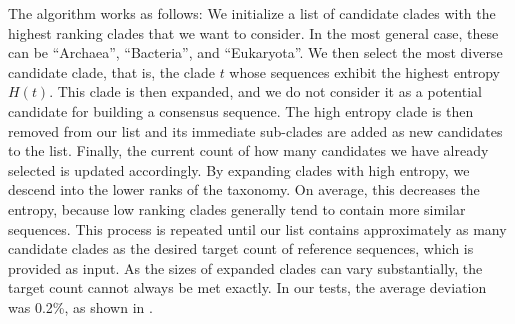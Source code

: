 The algorithm works as follows:
We initialize a list of candidate clades with the highest ranking clades that we want to consider.
In the most general case, these can be ``Archaea'',  ``Bacteria'', and ``Eukaryota''.
We then select the most diverse candidate clade, that is,
the clade $t$ whose sequences exhibit the highest entropy $H(t)$.
This clade is then expanded,
and we do not consider it as a potential candidate for building a consensus sequence.
The high entropy clade is then removed from our list and its immediate sub-clades are added as new candidates to the list.
Finally, the current count of how many candidates we have already selected is updated accordingly.
By expanding clades with high entropy, we descend into the lower ranks of the taxonomy.
On average, this decreases the entropy,
because low ranking clades generally tend to contain more similar sequences.
This process is repeated until our list contains approximately as many candidate clades
as the desired target count of reference sequences, which is provided as input.
As the sizes of expanded clades can vary substantially, the target count cannot always be met exactly.
In our tests, the average deviation was \num{0.2}\%, as shown in .



